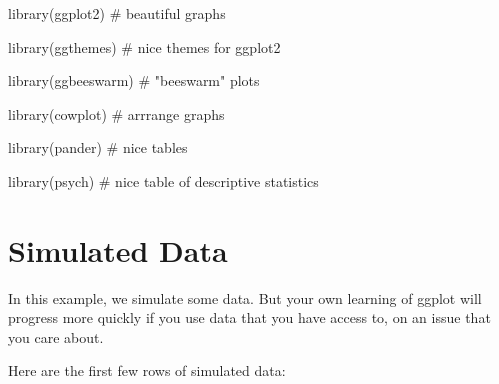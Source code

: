 \documentclass[12pt,]{article}
\newenvironment{Shaded}{}{}
\newcommand{\CommentTok}[1]{\textcolor[rgb]{0.00,0.50,0.00}{#1}}
\newcommand{\KeywordTok}[1]{\textcolor[rgb]{0.00,0.00,1.00}{#1}}
\newcommand{\NormalTok}[1]{#1}
\begin{document}
\begin{Shaded}
\begin{Highlighting}[]
\KeywordTok{library}\NormalTok{(ggplot2) }\CommentTok{# beautiful graphs}

\KeywordTok{library}\NormalTok{(ggthemes) }\CommentTok{# nice themes for ggplot2}

\KeywordTok{library}\NormalTok{(ggbeeswarm) }\CommentTok{# "beeswarm" plots}

\KeywordTok{library}\NormalTok{(cowplot) }\CommentTok{# arrrange graphs}

\KeywordTok{library}\NormalTok{(pander) }\CommentTok{# nice tables}

\KeywordTok{library}\NormalTok{(psych) }\CommentTok{# nice table of descriptive statistics}
\end{Highlighting}
\end{Shaded}

\hypertarget{simulated-data}{%
\section{Simulated Data}\label{simulated-data}}

In this example, we simulate some data. But your own learning of ggplot
will progress more quickly if you use data that you have access to, on
an issue that you care about.

Here are the first few rows of simulated data:
\end{document}
